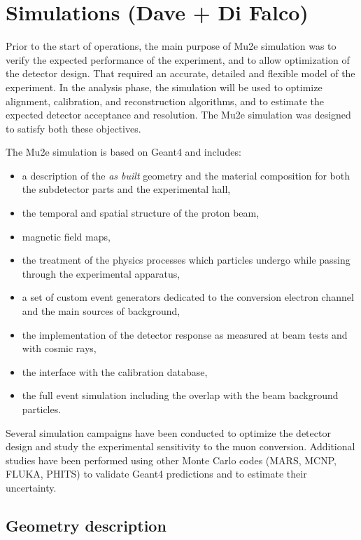 \section{Simulations (Dave + Di Falco)}
\label{sec:simulation}

Prior to the start of operations, the main purpose of Mu2e simulation was to verify the expected performance of the experiment, and to allow optimization of the detector design. That required an accurate, detailed and flexible model of the experiment. In the analysis phase, the simulation will be used to optimize alignment, calibration, and reconstruction algorithms, and to estimate the expected detector acceptance and resolution.  The Mu2e simulation was designed to satisfy both these objectives.

The Mu2e simulation is based on Geant4 \cite{geant4:2003,geant4:2006,geant4:2016} and includes:
\begin{itemize}
\item a description of the {\em as built} geometry and the material composition for both the subdetector parts and the experimental hall,  
\item the temporal and spatial structure of the proton beam,
\item magnetic field maps,
\item the treatment of the physics processes which particles undergo while passing through the experimental apparatus,
\item a set of custom event generators dedicated to the conversion electron channel and the main sources of background, 
\item the implementation of the detector response as measured at beam tests and with cosmic rays, 
\item the interface with the calibration database, 
\item the full event simulation including the overlap with the beam background particles.
\end{itemize}
Several simulation campaigns have been conducted to optimize the detector design and study the experimental sensitivity to the muon conversion.
Additional studies have been performed using other Monte Carlo codes (MARS\cite{MARS:2009}, MCNP\cite{MARS:2009,MCNP:2012}, FLUKA\cite{FLUKA:2013}, PHITS\cite{PHITS:2018}) to validate Geant4 predictions and to estimate their uncertainty.

\subsection{ Geometry description}

